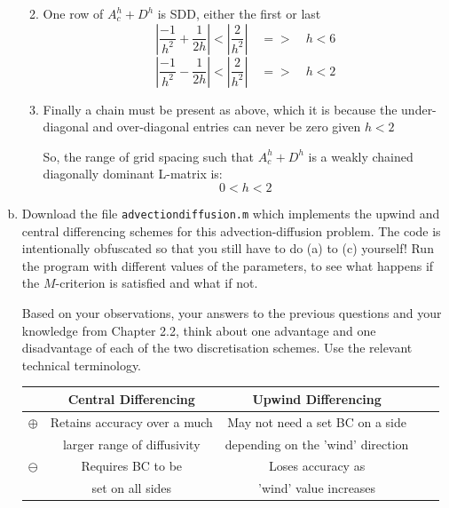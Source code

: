 \documentclass[10pt,letterpaper]{scrartcl}
\begin{document}
\begin{enumerate}[(a)]
\begin{enumerate}
\vfill

\newpage
    \item One row of $A^h_c+D^h$ is SDD, either the first or last
        \begin{equation*}
           \left| \frac{-1}{h^2} + \frac{1}{2h}\right| < \left|\frac{2}{h^2}\right| \quad => \quad h < 6
        \end{equation*}
        \begin{equation*}
           \left| \frac{-1}{h^2} - \frac{1}{2h}\right| < \left|\frac{2}{h^2}\right| \quad => \quad h < 2
        \end{equation*}
    
    \item Finally a chain must be present as above, which it is because the under-diagonal and over-diagonal entries can never be zero given $h < 2$
    
    So, the range of grid spacing such that $A^h_c+D^h$ is a weakly chained diagonally dominant L-matrix is:
    \[0 < h < 2\]
    
\end{enumerate}

\mbox{}

\newpage

\item Download the file \texttt{advection\textunderscore diffusion.m} which implements the upwind and central differencing schemes for this advection-diffusion problem. The code is intentionally obfuscated so that you still have to do (a) to (c) yourself!  Run the program with different values of the parameters, to see what happens if the $M$-criterion is satisfied and what if not.

Based on your observations, your answers to the previous questions and your knowledge from Chapter 2.2, think about one advantage and one disadvantage of each of the two discretisation schemes. Use the relevant technical terminology.

\begin{center}
\begin{tabular}{lcc}
\toprule
 & Central Differencing & Upwind Differencing\\
\toprule
$\oplus$ & Retains accuracy over a much  & May not need a set BC on a side \\
& larger range of diffusivity & depending on the 'wind' direction
&  \phantom{\rule{1cm}{1cm}} & \phantom{\rule{1cm}{1cm}}\\
\midrule
$\ominus$ & Requires BC to be  & Loses accuracy as \\
& set on all sides & 'wind' value increases
& \phantom{\rule{1cm}{1cm}} & \phantom{\rule{1cm}{1cm}}\\
\bottomrule
\end{tabular}
\end{center}

\end{enumerate}
\end{document}
